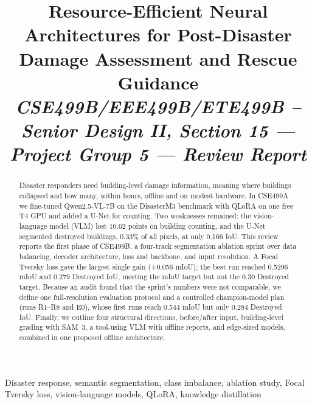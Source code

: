 \documentclass[conference]{IEEEtran}
\begin{document}
\title{Resource-Efficient Neural Architectures for Post-Disaster Damage Assessment and Rescue Guidance\\[1pt]
{\normalsize\itshape CSE499B/EEE499B/ETE499B -- Senior Design II, Section 15 --- Project Group 5 --- Review Report}}

\author{
\and
{}
\and
{}
\and
{}
\and
{}
}

\maketitle

\begin{abstract}
Disaster responders need building-level damage information, meaning where buildings collapsed and how many, within hours, offline and on modest hardware. In CSE499A we fine-tuned Qwen2.5-VL-7B on the DisasterM3 benchmark with QLoRA on one free T4 GPU and added a U-Net for counting. Two weaknesses remained: the vision-language model (VLM) lost 10.62 points on building counting, and the U-Net segmented destroyed buildings, 0.33\% of all pixels, at only 0.166 IoU. This review reports the first phase of CSE499B, a four-track segmentation ablation sprint over data balancing, decoder architecture, loss and backbone, and input resolution. A Focal Tversky loss gave the largest single gain (+0.056 mIoU); the best run reached 0.5296 mIoU and 0.279 Destroyed IoU, meeting the mIoU target but not the 0.30 Destroyed target. Because an audit found that the sprint's numbers were not comparable, we define one full-resolution evaluation protocol and a controlled champion-model plan (runs R1--R8 and E0), whose first runs reach 0.544 mIoU but only 0.284 Destroyed IoU. Finally, we outline four structural directions, before/after input, building-level grading with SAM~3, a tool-using VLM with offline reports, and edge-sized models, combined in one proposed offline architecture.
\end{abstract}

\begin{IEEEkeywords}
Disaster response, semantic segmentation, class imbalance, ablation study, Focal Tversky loss, vision-language models, QLoRA, knowledge distillation
\end{IEEEkeywords}
\end{document}
